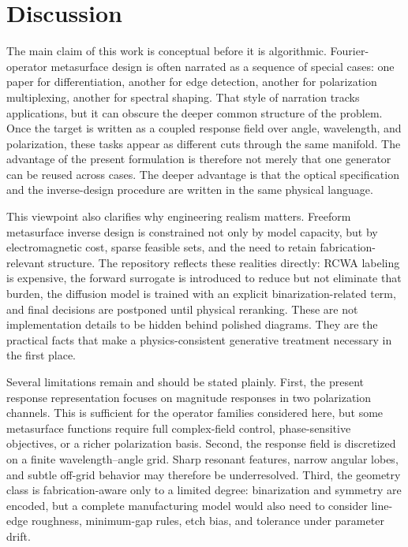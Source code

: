 \section{Discussion}

The main claim of this work is conceptual before it is algorithmic. Fourier-operator metasurface design is often narrated as a sequence of special cases: one paper for differentiation, another for edge detection, another for polarization multiplexing, another for spectral shaping. That style of narration tracks applications, but it can obscure the deeper common structure of the problem. Once the target is written as a coupled response field over angle, wavelength, and polarization, these tasks appear as different cuts through the same manifold. The advantage of the present formulation is therefore not merely that one generator can be reused across cases. The deeper advantage is that the optical specification and the inverse-design procedure are written in the same physical language.

This viewpoint also clarifies why engineering realism matters. Freeform metasurface inverse design is constrained not only by model capacity, but by electromagnetic cost, sparse feasible sets, and the need to retain fabrication-relevant structure. The repository reflects these realities directly: RCWA labeling is expensive, the forward surrogate is introduced to reduce but not eliminate that burden, the diffusion model is trained with an explicit binarization-related term, and final decisions are postponed until physical reranking. These are not implementation details to be hidden behind polished diagrams. They are the practical facts that make a physics-consistent generative treatment necessary in the first place.

Several limitations remain and should be stated plainly. First, the present response representation focuses on magnitude responses in two polarization channels. This is sufficient for the operator families considered here, but some metasurface functions require full complex-field control, phase-sensitive objectives, or a richer polarization basis. Second, the response field is discretized on a finite wavelength--angle grid. Sharp resonant features, narrow angular lobes, and subtle off-grid behavior may therefore be underresolved. Third, the geometry class is fabrication-aware only to a limited degree: binarization and symmetry are encoded, but a complete manufacturing model would also need to consider line-edge roughness, minimum-gap rules, etch bias, and tolerance under parameter drift.


